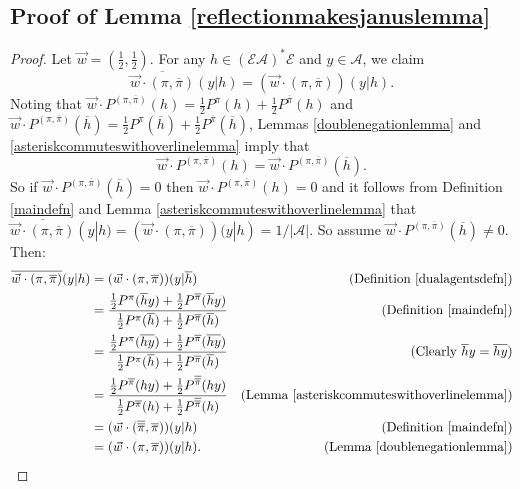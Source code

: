 \documentclass[twoside]{article}
\begin{document}
\subsection{Proof of Lemma \ref{reflectionmakesjanuslemma}}
\begin{proof}
    Let $\vec w=(\frac12,\frac12)$.
    For any $h\in(\mathcal E\mathcal A)^*\mathcal E$ and $y\in\mathcal A$,
    we claim
    \[
        \overline{\vec w\cdot(\pi,\overline{\pi})}(y|h)
        =(\vec w\cdot(\pi,\overline{\pi}))(y|h).
    \]
    Noting that
    $\vec w\cdot P^{(\pi,\overline{\pi})}(h)
    =\frac12P^\pi(h)+\frac12P^{\overline\pi}(h)$
    and
    $\vec w\cdot P^{(\pi,\overline{\pi})}(\overline h)
    =\frac12P^\pi(\overline h)+\frac12P^{\overline\pi}(\overline h)$,
    Lemmas \ref{doublenegationlemma} and \ref{asteriskcommuteswithoverlinelemma}
    imply that
    \[\vec w\cdot P^{(\pi,\overline{\pi})}(h)
    =\vec w\cdot P^{(\pi,\overline{\pi})}(\overline h).\]
    So if
    $\vec w\cdot P^{(\pi,\overline{\pi})}(\overline h)=0$
    then $\vec w\cdot P^{(\pi,\overline{\pi})}(h)=0$
    and it follows from
    Definition \ref{maindefn}
    and Lemma \ref{asteriskcommuteswithoverlinelemma} that
    $\overline{\vec w\cdot(\pi,\overline{\pi})}(y|h)
    =(\vec w\cdot(\pi,\overline{\pi}))(y|h)=1/|\mathcal A|$.
    So assume $\vec w\cdot P^{(\pi,\overline{\pi})}(\overline h)\not=0$.
    Then:
    \begin{align*}
        \overline{\vec w\cdot(\pi,\overline{\pi})}(y|h)
        &= (\vec w\cdot(\pi,\overline{\pi}))(y|\overline h)
            &\mbox{(Definition \ref{dualagentsdefn})}\\
        &= \frac
            {\frac12P^\pi(\overline hy)+\frac12P^{\overline\pi}(\overline hy)}
            {\frac12P^\pi(\overline h)+\frac12P^{\overline\pi}(\overline h)}
            &\mbox{(Definition \ref{maindefn})}\\
        &= \frac
            {\frac12P^\pi(\overline{hy})+\frac12P^{\overline\pi}(\overline{hy})}
            {\frac12P^\pi(\overline h)+\frac12P^{\overline\pi}(\overline h)}
            &\mbox{(Clearly $\overline hy=\overline{hy}$)}\\
        &= \frac
            {\frac12P^{\overline\pi}(hy)+\frac12P^{\overline{\overline\pi}}(hy)}
            {\frac12P^{\overline\pi}(h)+\frac12P^{\overline{\overline\pi}}(h)}
            &\mbox{(Lemma \ref{asteriskcommuteswithoverlinelemma})}\\
        &= (\vec w\cdot(\overline{\overline\pi},\overline\pi))(y|h)
            &\mbox{(Definition \ref{maindefn})}\\
        &= (\vec w\cdot(\pi,\overline\pi))(y|h).
            &\mbox{(Lemma \ref{doublenegationlemma})}
    \end{align*}
\end{proof}
\end{document}
